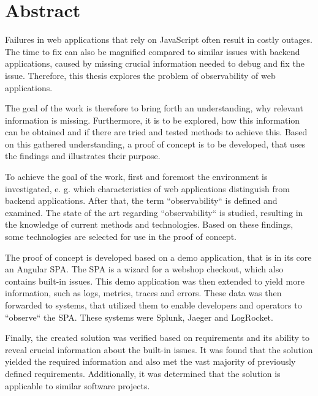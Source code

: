 \newpage{}

\section*{\thispagestyle{empty}Abstract}

Failures in web applications that rely on JavaScript often result in costly outages. The time to fix can also be magnified compared to similar issues with backend applications, caused by missing crucial information needed to debug and fix the issue. Therefore, this thesis explores the problem of observability of web applications.

The goal of the work is therefore to bring forth an understanding, why relevant information is missing. Furthermore, it is to be explored, how this information can be obtained and if there are tried and tested methods to achieve this. Based on this gathered understanding, a proof of concept is to be developed, that uses the findings and illustrates their purpose.

To achieve the goal of the work, first and foremost the environment is investigated, e. g. which characteristics of web applications distinguish from backend applications. After that, the term ``observability`` is defined and examined. The state of the art regarding ``observability`` is studied, resulting in the knowledge of current methods and technologies. Based on these findings, some technologies are selected for use in the proof of concept.

The proof of concept is developed based on a demo application, that is in its core an Angular SPA. The SPA is a wizard for a webshop checkout, which also contains built-in issues. This demo application was then extended to yield more information, such as logs, metrics, traces and errors. These data was then forwarded to systems, that utilized them to enable developers and operators to ``observe`` the SPA. These systems were Splunk, Jaeger and LogRocket.

Finally, the created solution was verified based on requirements and its ability to reveal crucial information about the built-in issues. It was found that the solution yielded the required information and also met the vast majority of previously defined requirements. Additionally, it was determined that the solution is applicable to similar software projects.